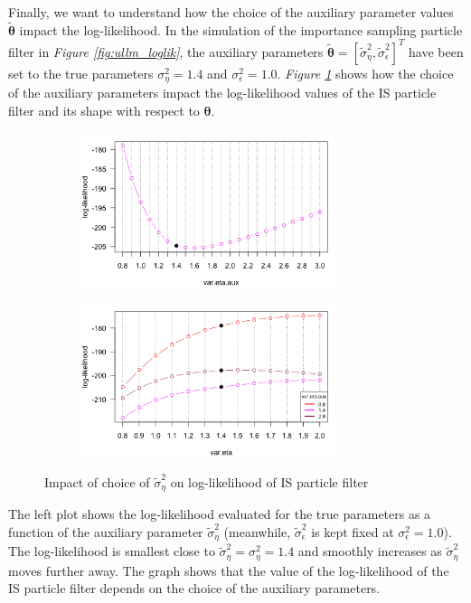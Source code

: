 \documentclass[11pt, oneside]{scrreprt}   	%
\begin{document}
Finally, we want to understand how the choice of the auxiliary parameter values $\boldsymbol{\tilde{\theta}}$ impact the log-likelihood. In the simulation  of the importance sampling particle filter in \textit{Figure \ref{fig:ullm_loglik}}, the auxiliary parameters $\boldsymbol{\tilde{\theta}}=[\tilde{\sigma}_{\eta}^2, \tilde{\sigma}_{\epsilon}^2]^T$ have been set to the true parameters $\sigma_{\eta}^2=1.4$ and $\sigma_{\epsilon}^2=1.0$. \textit{Figure \ref{fig:ullm_theta_aux}} shows how the choice of the auxiliary parameters impact the log-likelihood values of the IS particle filter and its shape with respect to $\boldsymbol{\theta}$. \\

\begin{figure}[h!]
\centering
\begin{subfigure}{0.5\textwidth}
  \centering
  \includegraphics[width=75mm]{../../images/ullm-loglik-aux-eta.png}
\end{subfigure}%
\begin{subfigure}{0.5\textwidth}
  \centering
  \includegraphics[width=75mm]{../../images/ullm-loglik-aux-eta-2.png}
\end{subfigure}
\caption{Impact of choice of $\tilde{\sigma}_{\eta}^2$ on log-likelihood of IS particle filter}
\label{fig:ullm_theta_aux}
\end{figure}

The left plot shows the log-likelihood evaluated for the true parameters as a function of the auxiliary parameter $\tilde{\sigma}_{\eta}^2$ (meanwhile, $\tilde{\sigma}_{\epsilon}^2$ is kept fixed at $\sigma_{\epsilon}^2=1.0$). The log-likelihood is smallest close to $\tilde{\sigma}_{\eta}^2=\sigma_{\eta}^2=1.4$ and smoothly increases as $\tilde{\sigma}_{\eta}^2$ moves further away. The graph shows that the value of the log-likelihood of the IS particle filter depends on the choice of the auxiliary parameters.\\
\end{document}
